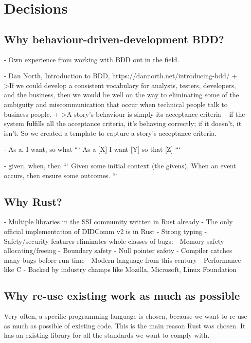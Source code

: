 \chapter{Decisions}


\section{Why behaviour-driven-development BDD?}

- Own experience from working with BDD out in the field.

- Dan North, Introduction to BDD, https://dannorth.net/introducing-bdd/
    + >If we could develop a consistent vocabulary for analysts, testers, developers, and the business, then we would be well on the way to eliminating some of the ambiguity and miscommunication that occur when technical people talk to business people.
    + >A story’s behaviour is simply its acceptance criteria – if the system fulfills all the acceptance criteria, it’s behaving correctly; if it doesn’t, it isn’t. So we created a template to capture a story’s acceptance criteria.

- As a, I want, so what
    ```
    As a [X]
    I want [Y]
    so that [Z]
    ```

- given, when, then
    ```
    Given some initial context (the givens),
    When an event occurs,
    then ensure some outcomes.
    ```

\section{Why Rust?}

- Multiple libraries in the SSI community written in Rust already
- The only official implementation of DIDComm v2 is in Rust
- Strong typing
- Safety/security features eliminates whole classes of bugs:
    - Memory safety - allocating/freeing
    - Boundary safety
    - Null pointer safety
- Compiler catches many bugs before run-time
- Modern language from this century
- Performance like C
- Backed by industry champs like Mozilla, Microsoft, Linux Foundation



\section{Why re-use existing work as much as possible}

Very often, a specific programming language is chosen, because we want to re-use as much as possible of existing code. This is the main reason Rust was chosen. It has an existing library for all the standards we want to comply with.

